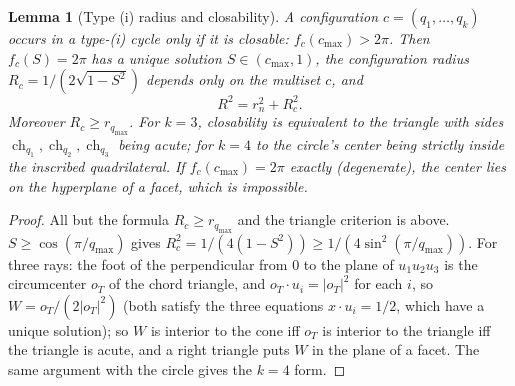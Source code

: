 \documentclass[11pt]{article}
\newtheorem{lemma}[theorem]{Lemma}
\theoremstyle{definition}
\theoremstyle{remark}
\newcommand{\ch}{\operatorname{ch}}
\begin{document}
\begin{appendices}
\begin{lemma}[Type (i) radius and closability]\label{lem:typei}
A configuration $c=(q_1,\dots,q_k)$ occurs in a type-(i) cycle only if it
is \emph{closable}: $f_c(c_{\max})>2\pi$. Then $f_c(S)=2\pi$ has a unique
solution $S\in(c_{\max},1)$, the \emph{configuration radius}
$R_c=1/(2\sqrt{1-S^2})$ depends only on the multiset $c$, and
\[R^2=r_n^2+R_c^2.\]
Moreover $R_c\ge r_{q_{\max}}$. For $k=3$, closability is equivalent to the
triangle with sides $\ch_{q_1},\ch_{q_2},\ch_{q_3}$ being acute; for $k=4$
to the circle's center being strictly inside the inscribed quadrilateral.
If $f_c(c_{\max})=2\pi$ exactly (\emph{degenerate}), the center lies on the
hyperplane of a facet, which is impossible.
\end{lemma}
\begin{proof}
All but the formula $R_c\ge r_{q_{\max}}$ and the triangle criterion is
above. $S\ge\cos(\pi/q_{\max})$ gives
$R_c^2=1/(4(1-S^2))\ge1/(4\sin^2(\pi/q_{\max}))$. For three rays: the foot of
the perpendicular from $0$ to the plane of $u_1u_2u_3$ is the circumcenter
$o_T$ of the chord triangle, and $o_T\cdot u_i=|o_T|^2$ for each $i$, so
$W=o_T/(2|o_T|^2)$ (both satisfy the three equations $x\cdot u_i=1/2$, which
have a unique solution); so $W$ is interior to
the cone iff $o_T$ is interior to the triangle iff the triangle is acute,
and a right triangle puts $W$ in the plane of a facet. The same argument
with the circle gives the $k=4$ form.
\end{proof}



\end{appendices}
\end{document}
